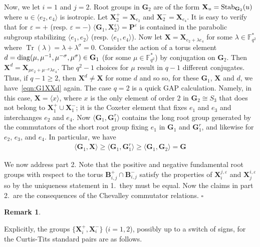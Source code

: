 \documentclass[12pt]{amsart}
\theoremstyle{definition}
\newtheorem{remark}[theorem]{Remark}
\newcommand{\epf}{\qed}
\newcommand{\bre}{\begin{remark}}
\newcommand{\ere}{\end{remark}}
\newcommand{\diag}{\mathop{\rm diag}\nolimits}
\newcommand{\FF}{{\mathbb F}}
\newcommand{\Stab}{\mathop{\rm Stab}}
\newcommand{\vep}{\varepsilon}
\renewcommand{\qed}{\hfill $\square$}
\newcommand{\amgrpB}{{\mathbf{B}}}
\newcommand{\amgrpG}{{\mathbf{G}}}
\newcommand{\amgrpP}{{\mathbf{P}}}
\newcommand{\amgrpX}{{\mathbf{X}}}
\DeclareMathOperator{\Tr}{Tr}
\begin{document}
Now, we let $i=1$ and $j=2$.
Root groups in $\amgrpG_2$ are of the form $\amgrpX_u=\Stab_{\amgrpG_2}(u)$ where $u\in \langle e_2,e_4\rangle$ is isotropic.
Let $\amgrpX_2^+=\amgrpX_{e_2}$  and $\amgrpX_2^-=\amgrpX_{e_4}$.
It is easy to verify that for $\vep=+$ (resp. $\vep=-$) $\langle \amgrpG_1,\amgrpX_2^\vep\rangle=\amgrpP^\vep$  is contained in the parabolic subgroup stabilizing $\langle e_1,e_2\rangle $ 
(resp. $\langle e_1,e_4\rangle$).
Now let $\amgrpX=\amgrpX_{e_2+\lambda e_4}$ for some $\lambda\in\FF_{q^2}^*$ where 
 $\Tr(\lambda)=\lambda+\lambda^\sigma=0$.
Consider the action of a torus element $d=\diag(\mu, \mu^{-1}, \mu^{-\sigma}, \mu^\sigma)\in \amgrpG_1$ (for some $\mu\in \FF_{q^2}^*$) by conjugation on $\amgrpG_2$. 
Then $\amgrpX^d=\amgrpX_{\mu e_2+ \mu^{-\sigma}\lambda e_4}$.
The $q^2-1$ choices for $\mu$ result in $q-1$ different conjugates. 
Thus, if $q-1\ge 2$, then $\amgrpX^d\ne \amgrpX$ for some $d$ and so  so, for these $\amgrpG_1$, $\amgrpX$ and $d$, we have~\eqref{eqn:G1XXd} again.
The case $q=2$ is a quick GAP calculation.
Namely, in this case, $\amgrpX=\langle x\rangle$, where $x$ is the only element of order $2$ in $\amgrpG_2\cong S_3$ that does not belong to $\amgrpX_1^+\cup \amgrpX_1^-$; it is the Coxeter element that fixes $e_1$ and $e_3$ and interchanges $e_2$ and $e_4$.
Now $\langle \amgrpG_1,\amgrpG_1^r\rangle$ contains the long root group generated by the commutators of the short root group fixing $e_1$ in $\amgrpG_1$ and $\amgrpG_1^r$, and likewise for $e_2$, $e_3$, and $e_4$.
In particular, we have 
\begin{align}
\langle \amgrpG_1, \amgrpX\rangle\ge \langle \amgrpG_1,\amgrpG_1^r\rangle\ge \langle\amgrpG_1,\amgrpG_2\rangle=\amgrpG \label{eqn:<Gj,Gj^X> =G}
\end{align}


We now address part 2.
Note that the positive and negative fundamental root groups with respect to the torus $\amgrpB_{i,j}^+\cap \amgrpB_{i,j}^-$ satisfy the properties of $\amgrpX_i^{j,\vep}$ and  $\amgrpX_j^{i,\vep}$ so by the uniqueness statement in 1.~they must be equal.
Now the claims in part 2.~are the consequences of the Chevalley commutator relations.
\epf


\bre
 \ere

Explicitly, the groups $\{\amgrpX_i^+,\amgrpX_i^-\}$ ($i=1,2$), possibly up to a switch of signs, for the Curtis-Tits standard pairs are as follows.
\end{document}

